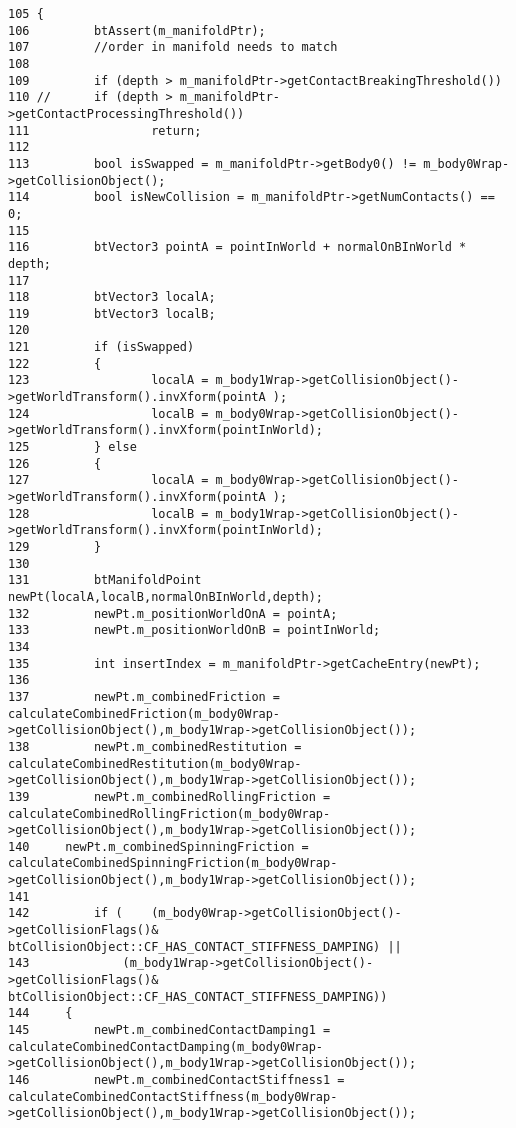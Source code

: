 \begin{Code}\begin{verbatim}105 {
106         btAssert(m_manifoldPtr);
107         //order in manifold needs to match
108 
109         if (depth > m_manifoldPtr->getContactBreakingThreshold())
110 //      if (depth > m_manifoldPtr->getContactProcessingThreshold())
111                 return;
112 
113         bool isSwapped = m_manifoldPtr->getBody0() != m_body0Wrap->getCollisionObject();
114         bool isNewCollision = m_manifoldPtr->getNumContacts() == 0;
115 
116         btVector3 pointA = pointInWorld + normalOnBInWorld * depth;
117 
118         btVector3 localA;
119         btVector3 localB;
120         
121         if (isSwapped)
122         {
123                 localA = m_body1Wrap->getCollisionObject()->getWorldTransform().invXform(pointA );
124                 localB = m_body0Wrap->getCollisionObject()->getWorldTransform().invXform(pointInWorld);
125         } else
126         {
127                 localA = m_body0Wrap->getCollisionObject()->getWorldTransform().invXform(pointA );
128                 localB = m_body1Wrap->getCollisionObject()->getWorldTransform().invXform(pointInWorld);
129         }
130 
131         btManifoldPoint newPt(localA,localB,normalOnBInWorld,depth);
132         newPt.m_positionWorldOnA = pointA;
133         newPt.m_positionWorldOnB = pointInWorld;
134         
135         int insertIndex = m_manifoldPtr->getCacheEntry(newPt);
136 
137         newPt.m_combinedFriction = calculateCombinedFriction(m_body0Wrap->getCollisionObject(),m_body1Wrap->getCollisionObject());
138         newPt.m_combinedRestitution = calculateCombinedRestitution(m_body0Wrap->getCollisionObject(),m_body1Wrap->getCollisionObject());
139         newPt.m_combinedRollingFriction = calculateCombinedRollingFriction(m_body0Wrap->getCollisionObject(),m_body1Wrap->getCollisionObject());
140     newPt.m_combinedSpinningFriction = calculateCombinedSpinningFriction(m_body0Wrap->getCollisionObject(),m_body1Wrap->getCollisionObject());
141         
142         if (    (m_body0Wrap->getCollisionObject()->getCollisionFlags()& btCollisionObject::CF_HAS_CONTACT_STIFFNESS_DAMPING) ||
143             (m_body1Wrap->getCollisionObject()->getCollisionFlags()& btCollisionObject::CF_HAS_CONTACT_STIFFNESS_DAMPING))
144     {
145         newPt.m_combinedContactDamping1 = calculateCombinedContactDamping(m_body0Wrap->getCollisionObject(),m_body1Wrap->getCollisionObject());
146         newPt.m_combinedContactStiffness1 = calculateCombinedContactStiffness(m_body0Wrap->getCollisionObject(),m_body1Wrap->getCollisionObject());

\end{verbatim}
\end{Code}
